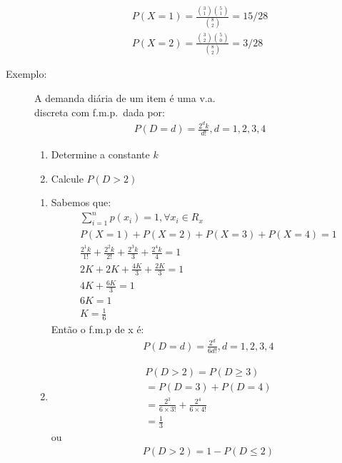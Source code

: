 \begin{description}
       \begin{align*}
         P(X=1) = \frac{ \binom{3}{1} \binom{5}{1} }{ \binom{8}{2}}= 15/28 \\
         P(X=2) = \frac{ \binom{3}{2} \binom{5}{0} }{ \binom{8}{2}}= 3/28 
       \end{align*}
     \item [Exemplo:] A demanda diária de um item é uma v.a.\\ discreta com f.m.p.\ dada por: 
       \begin{align}
         P(D=d)=\frac{2^d k}{d!}, d=1,2,3,4
       \end{align}
       \begin{enumerate}[label=(\alph*)]
         \item Determine a constante $k$
         \item Calcule $P(D>2)$
       \end{enumerate}
       \begin{enumerate}[label=(\alph*)]
         \item Sabemos que: 
           \begin{align*}
             \sum^{n}_{i=1} p(x_i)=1, \forall x_i \in R_{x}\\
             P(X=1)+P(X=2)+P(X=3)+P(X=4)=1\\
             \frac{2^1 k}{1!}+\frac{2^2 k}{2!}+\frac{2^3 k}{3\!}+\frac{2^4 k}{4\!}=1\\
             2K + 2K+ \frac{4K}{3}+\frac{2K}{3}=1 \\
             4K+\frac{6K}{3}=1 \\
             6K=1\\
             K=\frac{1}{6}
           \end{align*}
           Então o f.m.p de x é: 
           \begin{align*}
             P(D=d)=\frac{2^d}{6d!}, d=1,2,3,4
           \end{align*}
         \item 
           \begin{align*}
             P(D>2)=P(D \geq 3) \\
             =P(D=3)+P(D=4)\\
             =\frac{2^3}{6\times 3!}+ \frac{2^4}{6\times 4!}\\
             =\frac{1}{3}
           \end{align*}
           ou 
           \begin{align*}
             P(D>2)=1-P(D\le 2)\\

\end{align*}
\end{enumerate}
\end{description}
